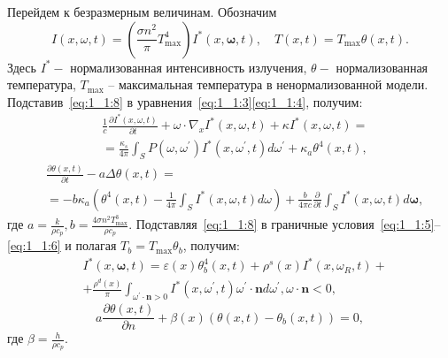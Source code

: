 Перейдем к безразмерным величинам.
Обозначим
\begin{equation}
    \label{eq:1_1:8}
    I(x, \omega, t)=\left(\frac{\sigma n^{2}}{\pi}
    T_{\max }^{4}\right) I^{*}(x, \boldsymbol{\omega}, t),
    \quad T(x, t)=T_{\max } \theta(x, t).
\end{equation}
Здесь $I^{*}-$ нормализованная интенсивность излучения,
$\theta-$ нормализованная температура, $T_{\max }$ -- максимальная температура
в ненормализованной модели.
Подставив~\eqref{eq:1_1:8} в уравнения~\eqref{eq:1_1:3}\eqref{eq:1_1:4}, получим:
\begin{equation}
    \label{eq:1_1:9}
    \begin{aligned}
        &\frac{1}{c} \frac{\partial I^{*}(x, \omega, t)}{\partial t}
        +\omega \cdot \nabla_{x} I^{*}(x, \omega, t) +\kappa I^{*}(x, \omega, t)=\\
        &= \frac{\kappa_{s}}{4 \pi} \int_{S} P\left(\omega, \omega^{\prime}\right) I^{*}
        \left(x, \omega^{\prime}, t\right) d \omega^{\prime}+\kappa_{a} \theta^{4}(x, t),
    \end{aligned}
\end{equation}
\begin{equation}
    \label{eq:1_1:10}
    \begin{aligned}
        & \frac{\partial \theta(x, t)}{\partial t}
        - a \Delta \theta(x, t) = \\
        & = - b \kappa_{a}\left(\theta^{4}(x, t)-\frac{1}{4 \pi}
        \int_{S} I^{*}(x, \omega, t) d \omega\right)
        + \frac{b}{4 \pi c} \frac{\partial}{\partial t}
        \int_{S} I^{*}(x, \omega, t) d \boldsymbol{\omega},
    \end{aligned}
\end{equation}
где $a=\frac{k}{\rho c_{p}}, b=\frac{4 \sigma n^{2} T_{\max }^{3}}{\rho c_{p}}$.
Подставляя~\eqref{eq:1_1:8} в граничные условия~\eqref{eq:1_1:5}--\eqref{eq:1_1:6}
и полагая $T_{b}=T_{\max } \theta_{b}$, получим:
\begin{equation}
    \label{eq:1_1:11}
    \begin{aligned}
        & I^{*}(x, \boldsymbol{\omega}, t) =
        \varepsilon(x) \theta_{b}^{4}(x, t)
        +\rho^{s}(x) I^{*}\left(x, \omega_{R}, t\right)+ \\
        & +\frac{\rho^{d}(x)}{\pi} \int_{\omega^{\prime} \cdot \mathbf{n}>0} I^{*}
        \left(x, \omega^{\prime}, t\right) \omega^{\prime}
        \cdot \mathbf{n} d \omega^{\prime}, \omega \cdot \mathbf{n}<0,
    \end{aligned}
\end{equation}
\begin{equation}
    \label{eq:1_1:12}
    a \frac{\partial \theta(x, t)}{\partial n}+\beta(x)\left(\theta(x, t)
    -\theta_{b}(x, t)\right)=0,
\end{equation}
где $\beta=\frac{h}{\rho c_{p}}$.



